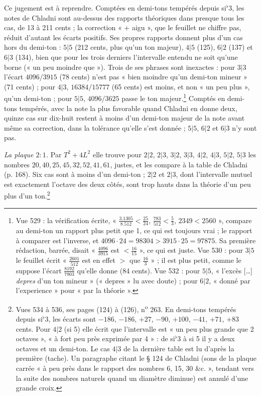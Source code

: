 \documentclass[11pt,a4paper]{article}
\begin{document}
Ce jugement est à reprendre. Comptées en demi-tons tempérés depuis si$^{\flat}$3,
les notes de Chladni sont au-dessus des rapports théoriques dans presque tous
les cas, de 13 à 211 cents ; la correction « + aigu », que le feuillet ne chiffre
pas, réduit d'autant les écarts positifs. Ses propres rapports donnent plus d'un
cas hors du demi-ton : $5|5$ (212 cents, plus qu'un ton majeur), $4|5$ (125),
$6|2$ (137) et $6|3$ (134), bien que pour les trois derniers l'intervalle entendu
ne soit qu'une borne (« un peu moindre que »). Trois de ses phrases sont
inexactes : pour $3|3$ l'écart $4096/3915$ (78 cents) n'est pas « bien moindre
qu'un demi-ton mineur » (71 cents) ; pour $4|3$, $16384/15777$ (65 cents) est
moins, et non « un peu plus », qu'un demi-ton ; pour $5|5$, $4096/3625$ passe le
ton majeur.\footnote{Vue 529 : la vérification écrite, « $\frac{3.1305}{8.512} <
\frac{25}{24}$, $\frac{783}{512} < \frac53$, $2349 < 2560$ », compare au
demi-ton un rapport plus petit que 1, ce qui est toujours vrai ; le rapport à
comparer est l'inverse, et $4096\cdot24 = 98304 > 3915\cdot25 = 97875$. Sa
première rédaction, barrée, disait « $\frac{4096}{3915}$ est $<\frac{16}{15}$ »,
ce qui est juste. Vue 530 : pour $3|5$ le feuillet écrit « $\frac{2601}{512}$
est en effet $>$ que $\frac{16}{3}$ » ; il est plus petit, comme le suppose
l'écart $\frac{8192}{7803}$ qu'elle donne (84 cents). Vue 532 : pour $5|5$,
« l'excès […] \emph{depres} d'un ton mineur » (« depres » lu avec doute) ; pour
$6|2$, « donné par l'experience » pour « par la théorie ».} Comptés en demi-tons tempérés, avec la note la plus
favorable quand Chladni en donne deux, quinze cas sur dix-huit restent à moins
d'un demi-ton majeur de la note avant même sa correction, dans la tolérance
qu'elle s'est donnée ; $5|5$, $6|2$ et $6|3$ n'y sont pas.

\emph{La plaque $2:1$.} Par $T^2+4L^2$ elle trouve pour $2|2$, $2|3$, $3|2$,
$3|3$, $4|2$, $4|3$, $5|2$, $5|3$ les nombres $20, 40, 25, 45, 32, 52, 41,
61$, justes, et les compare à la table de Chladni (p. 168). Six cas sont à moins
d'un demi-ton ; $2|2$ et $2|3$, dont l'intervalle mutuel est exactement l'octave
des deux côtés, sont trop hauts dans la théorie d'un peu plus d'un
ton.\footnote{Vues 534 à 536, ses pages (124) à (126), n\textsuperscript{o} 263.
En demi-tons tempérés depuis si$^{\flat}$3, les écarts sont $-186$, $-186$,
$+27$, $-90$, $+100$, $-41$, $+71$, $+83$ cents. Pour $4|2$ (si 5) elle écrit
que l'intervalle est « un peu plus grande que 2 octaves », « à fort peu près
exprimée par 4 » : de si$^{\flat}$3 à si 5 il y a deux octaves et un demi-ton.
Le cas $4|3$ de la dernière table est lu d'après la première (tache). Un
paragraphe citant le § 124 de Chladni (sons de la plaque carrée « à peu près dans
le rapport des nombres 6, 15, 30 \&c. », tendant vers la suite des nombres
naturels quand un diamètre diminue) est annulé d'une grande croix.}
\end{document}
